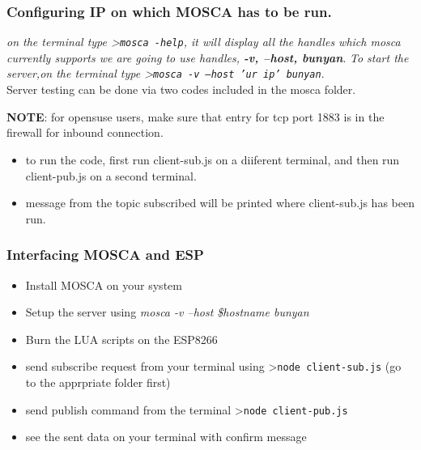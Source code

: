 \documentclass[16pt]{article}
\begin{document}
\subsubsection{Configuring IP on which MOSCA has to be run.}

\emph{on the terminal type \textgreater{}\texttt{mosca -help}, it will
display all the handles which mosca currently supports we are going to
use handles, {\textbf{-v, --host, \textbar{} bunyan}}}. \emph{To start the server,on
the terminal type \textgreater{}\texttt{mosca -v --host 'ur ip'
\textbar{}bunyan}}. \\ Server testing can be done via two codes included in
the mosca folder.

 

\vspace{0.3cm}

\textbf{NOTE}: for opensuse users, make sure that entry for tcp port
1883 is in the firewall for inbound connection.

\begin{itemize}

\item
  to run the code, first run client-sub.js on a diiferent terminal, and
  then run client-pub.js on a second terminal.
\item
  message from the topic subscribed will be printed where client-sub.js
  has been run.
\end{itemize}



\vspace{0.5cm}

\subsubsection{Interfacing MOSCA and ESP}

\begin{itemize}

\item
  Install MOSCA on your system
\item
  Setup the server using \emph{mosca -v --host \$hostname \textbar{}
  bunyan}
\item
  Burn the LUA scripts on the ESP8266
\item


  send subscribe request from your terminal using
  \textgreater{}\texttt{node client-sub.js} (go to the apprpriate folder
  first)
\item
  send publish command from the terminal
  \textgreater{}\texttt{node client-pub.js}
\item
  see the sent data on your terminal with confirm message
\end{itemize}
\end{document}

